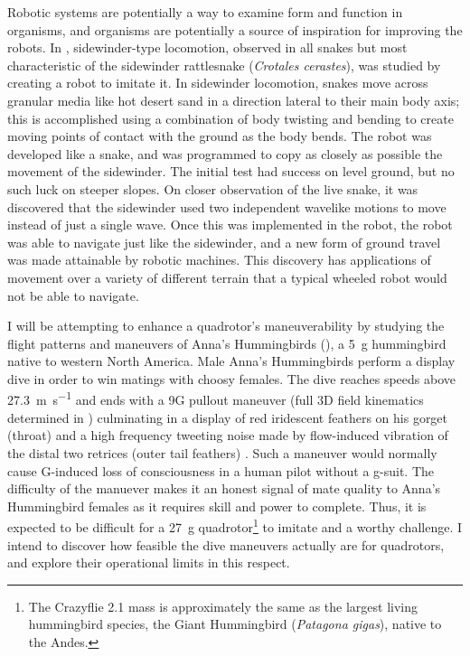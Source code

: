 Robotic systems are potentially a way to examine form and function in organisms, and organisms are potentially a source of inspiration for improving the robots.  In \cite{feltman2014creepy}, sidewinder-type locomotion, observed in all snakes but most characteristic of the sidewinder rattlesnake (\emph{Crotales cerastes}), was studied by creating a robot to imitate it. In sidewinder locomotion, snakes move across granular media like hot desert sand in a direction lateral to their main body axis; this is accomplished using a combination of body twisting and bending to create moving points of contact with the ground as the body bends.  The robot was developed like a snake, and was programmed to copy as closely as possible the movement of the sidewinder. The initial test had success on level ground, but no such luck on steeper slopes. On closer observation of the live snake, it was discovered that the sidewinder used two independent wavelike motions to move instead of just a single wave. Once this was implemented in the robot, the robot was able to navigate just like the sidewinder, and a new form of ground travel was made attainable by robotic machines. This discovery has applications of movement over a variety of different terrain that a typical wheeled robot would not be able to navigate.

I will be attempting to enhance a quadrotor’s maneuverability by studying the flight patterns and maneuvers of Anna’s Hummingbirds (\Calypteanna), a \SI{5}{\gram} hummingbird native to western North America. Male Anna's Hummingbirds perform a display dive in order to win matings with choosy females. The dive reaches speeds above \SI{27.3}{\meter\per\second} \cite{clark2009courtship}
 and ends with a 9G pullout maneuver (full 3D field kinematics determined in \cite{clark2009courtship}) culminating in a display of red iridescent feathers on his gorget (throat) and a high frequency tweeting noise made by flow-induced vibration of the distal two retrices (outer tail feathers) \cite{clark2008annas}. Such a maneuver would normally cause G-induced loss of consciousness in a human pilot without a g-suit.  The difficulty of the manuever makes it an honest signal \cite{zahavi1975mate} of mate quality to Anna's Hummingbird females as it requires skill and power to complete. Thus, it is expected to be difficult for a \SI{27}{\gram} quadrotor\footnote{The Crazyflie 2.1 mass is approximately the same as the largest living hummingbird species, the Giant Hummingbird (\emph{Patagona gigas}), native to the Andes.}  to imitate and a worthy challenge. I intend to discover how feasible the dive maneuvers actually are for quadrotors, and explore their operational limits in this respect. 

